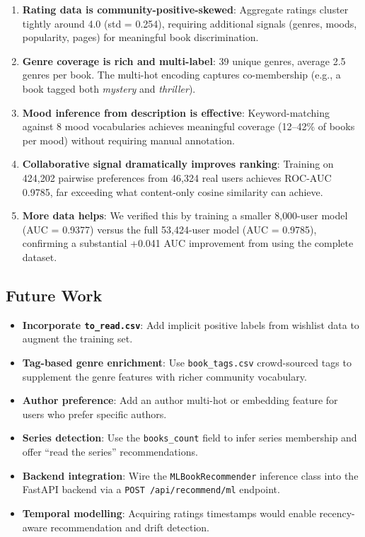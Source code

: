 \documentclass[12pt, a4paper]{article}
\newcommand{\code}[1]{\texttt{\small\color{shelfPurple}#1}}
\begin{document}
\begin{enumerate}[leftmargin=*, itemsep=6pt]
  \item \textbf{Rating data is community-positive-skewed}: Aggregate ratings cluster
        tightly around 4.0 (std = 0.254), requiring additional signals (genres, moods,
        popularity, pages) for meaningful book discrimination.
  \item \textbf{Genre coverage is rich and multi-label}: 39 unique genres, average
        2.5 genres per book. The multi-hot encoding captures co-membership (e.g.,
        a book tagged both \emph{mystery} and \emph{thriller}).
  \item \textbf{Mood inference from description is effective}: Keyword-matching against
        8 mood vocabularies achieves meaningful coverage (12--42\% of books per mood)
        without requiring manual annotation.
  \item \textbf{Collaborative signal dramatically improves ranking}: Training on
        424{,}202 pairwise preferences from 46{,}324 real users achieves ROC-AUC 0.9785,
        far exceeding what content-only cosine similarity can achieve.
  \item \textbf{More data helps}: We verified this by training a smaller 8{,}000-user
        model (AUC = 0.9377) versus the full 53{,}424-user model (AUC = 0.9785),
        confirming a substantial +0.041 AUC improvement from using the complete dataset.
\end{enumerate}

\subsection{Future Work}

\begin{itemize}[leftmargin=*, itemsep=4pt]
  \item \textbf{Incorporate \code{to\_read.csv}}: Add implicit positive labels from
        wishlist data to augment the training set.
  \item \textbf{Tag-based genre enrichment}: Use \code{book\_tags.csv} crowd-sourced
        tags to supplement the genre features with richer community vocabulary.
  \item \textbf{Author preference}: Add an author multi-hot or embedding feature
        for users who prefer specific authors.
  \item \textbf{Series detection}: Use the \code{books\_count} field to infer series
        membership and offer ``read the series'' recommendations.
  \item \textbf{Backend integration}: Wire the \code{MLBookRecommender} inference
        class into the FastAPI backend via a \code{POST /api/recommend/ml} endpoint.
  \item \textbf{Temporal modelling}: Acquiring ratings timestamps would enable
        recency-aware recommendation and drift detection.
\end{itemize}
\end{document}
